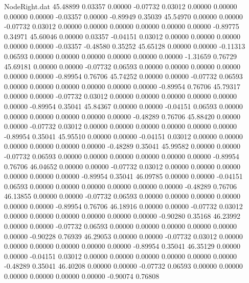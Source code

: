 \begin{filecontents}{NodeRight.dat}
  45.48899    0.03357    0.00000    -0.07732    0.03012    0.00000    0.00000    0.00000    0.00000   -0.03357    0.00000   -0.89949    0.35039
  45.54970    0.00000    0.00000    -0.07732    0.03012    0.00000    0.00000    0.00000    0.00000    0.00000    0.00000   -0.89775    0.34971
  45.60046    0.00000    0.03357    -0.04151    0.03012    0.00000    0.00000    0.00000    0.00000    0.00000   -0.03357   -0.48580    0.35252
  45.65128    0.00000    0.00000    -0.11313    0.06593    0.00000    0.00000    0.00000    0.00000    0.00000    0.00000   -1.31659    0.76729
  45.69181    0.00000    0.00000    -0.07732    0.06593    0.00000    0.00000    0.00000    0.00000    0.00000    0.00000   -0.89954    0.76706
  45.74252    0.00000    0.00000    -0.07732    0.06593    0.00000    0.00000    0.00000    0.00000    0.00000    0.00000   -0.89954    0.76706
  45.79317    0.00000    0.00000    -0.07732    0.03012    0.00000    0.00000    0.00000    0.00000    0.00000    0.00000   -0.89954    0.35041
  45.84367    0.00000    0.00000    -0.04151    0.06593    0.00000    0.00000    0.00000    0.00000    0.00000    0.00000   -0.48289    0.76706
  45.88420    0.00000    0.00000    -0.07732    0.03012    0.00000    0.00000    0.00000    0.00000    0.00000    0.00000   -0.89954    0.35041
  45.95510    0.00000    0.00000    -0.04151    0.03012    0.00000    0.00000    0.00000    0.00000    0.00000    0.00000   -0.48289    0.35041
  45.99582    0.00000    0.00000    -0.07732    0.06593    0.00000    0.00000    0.00000    0.00000    0.00000    0.00000   -0.89954    0.76706
  46.04652    0.00000    0.00000    -0.07732    0.03012    0.00000    0.00000    0.00000    0.00000    0.00000    0.00000   -0.89954    0.35041
  46.09785    0.00000    0.00000    -0.04151    0.06593    0.00000    0.00000    0.00000    0.00000    0.00000    0.00000   -0.48289    0.76706
  46.13855    0.00000    0.00000    -0.07732    0.06593    0.00000    0.00000    0.00000    0.00000    0.00000    0.00000   -0.89954    0.76706
  46.18916    0.00000    0.00000    -0.07732    0.03012    0.00000    0.00000    0.00000    0.00000    0.00000    0.00000   -0.90280    0.35168
  46.23992    0.00000    0.00000    -0.07732    0.06593    0.00000    0.00000    0.00000    0.00000    0.00000    0.00000   -0.90228    0.76939
  46.29053    0.00000    0.00000    -0.07732    0.03012    0.00000    0.00000    0.00000    0.00000    0.00000    0.00000   -0.89954    0.35041
  46.35129    0.00000    0.00000    -0.04151    0.03012    0.00000    0.00000    0.00000    0.00000    0.00000    0.00000   -0.48289    0.35041
  46.40208    0.00000    0.00000    -0.07732    0.06593    0.00000    0.00000    0.00000    0.00000    0.00000    0.00000   -0.90074    0.76808

\end{filecontents}
